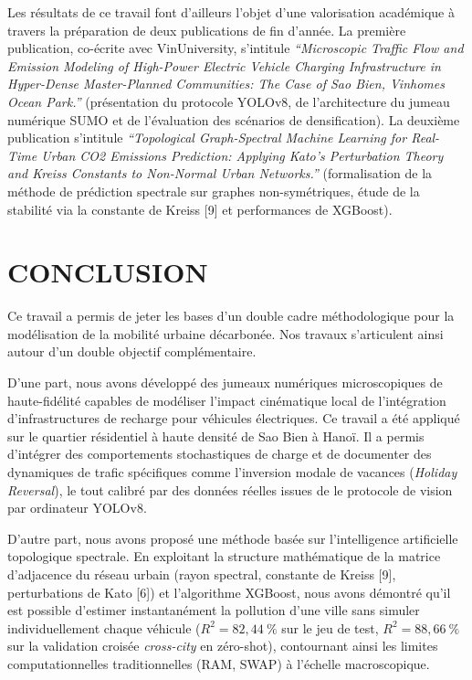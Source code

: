 \documentclass[10pt, a4paper]{article}
\begin{document}
Les résultats de ce travail font d'ailleurs l'objet d'une valorisation
académique à travers la préparation de deux publications de fin d'année.
La première publication, co-écrite avec VinUniversity, s'intitule
\emph{``Microscopic Traffic Flow and Emission Modeling of High-Power
Electric Vehicle Charging Infrastructure in Hyper-Dense Master-Planned
Communities: The Case of Sao Bien, Vinhomes Ocean Park.''} (présentation
du protocole YOLOv8, de l'architecture du jumeau numérique SUMO et de
l'évaluation des scénarios de densification). La deuxième publication
s'intitule \emph{``Topological Graph-Spectral Machine Learning for
Real-Time Urban CO2 Emissions Prediction: Applying Kato's Perturbation
Theory and Kreiss Constants to Non-Normal Urban Networks.''}
(formalisation de la méthode de prédiction spectrale sur graphes
non-symétriques, étude de la stabilité via la constante de Kreiss
{[}9{]} et performances de XGBoost).

\newpage

\section{CONCLUSION}\label{conclusion}

Ce travail a permis de jeter les bases d'un double cadre méthodologique
pour la modélisation de la mobilité urbaine décarbonée. Nos travaux
s'articulent ainsi autour d'un double objectif complémentaire.

D'une part, nous avons développé des jumeaux numériques microscopiques
de haute-fidélité capables de modéliser l'impact cinématique local de
l'intégration d'infrastructures de recharge pour véhicules électriques.
Ce travail a été appliqué sur le quartier résidentiel à haute densité de
Sao Bien à Hanoï. Il a permis d'intégrer des comportements stochastiques
de charge et de documenter des dynamiques de trafic spécifiques comme
l'inversion modale de vacances (\emph{Holiday Reversal}), le tout
calibré par des données réelles issues de le protocole de vision par
ordinateur YOLOv8.

D'autre part, nous avons proposé une méthode basée sur l'intelligence
artificielle topologique spectrale. En exploitant la structure
mathématique de la matrice d'adjacence du réseau urbain (rayon spectral,
constante de Kreiss {[}9{]}, perturbations de Kato {[}6{]}) et
l'algorithme XGBoost, nous avons démontré qu'il est possible d'estimer
instantanément la pollution d'une ville sans simuler individuellement
chaque véhicule (\(R^2 = 82{,}44\ \%\) sur le jeu de test,
\(R^2 = 88{,}66\ \%\) sur la validation croisée \emph{cross-city} en
zéro-shot), contournant ainsi les limites computationnelles
traditionnelles (RAM, SWAP) à l'échelle macroscopique.
\end{document}

